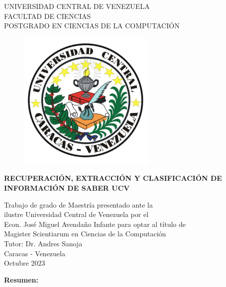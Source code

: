 \thispagestyle{empty}
\begin{center}
	UNIVERSIDAD CENTRAL DE VENEZUELA\\
	FACULTAD DE CIENCIAS\\
	POSTGRADO EN CIENCIAS DE LA COMPUTACI\'ON\\

	\begin{figure}
						\centering
						  \includegraphics[height=.7\textwidth]{images/UCV.png}
  \end{figure}
  \vspace{1.5cm}
  \large{\textbf{RECUPERACI\'ON, EXTRACCI\'ON Y CLASIFICACI\'ON DE \\ INFORMACI\'ON DE SABER UCV}}

  \vspace{3cm}
  Trabajo de grado de Maestría presentado ante la \\
  ilustre Universidad Central de Venezuela por el\\
  Econ. José Miguel Avendaño Infante para  optar
  al título de \\Magister Scientiarum en Ciencias de la Computaci\'on\\
  \vspace{0.5cm}
  Tutor: Dr. Andres Sanoja\\
  \vspace{1.5cm}
  Caracas - Venezuela\\
  Octubre 2023
\end{center}


\newpage
\thispagestyle{empty}
\large{\textbf{Resumen:}}

